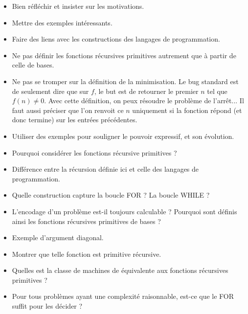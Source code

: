 \documentclass{agregfiche}
\begin{document}
\begin{itemize}
    \item Bien réfléchir et insister sur les motivations.
	\item Mettre des exemples intéressants.
    \item Faire des liens avec les constructions des langages de programmation.
	\item Ne pas définir les fonctions récursives primitives autrement que à partir de celle de bases.
    \item Ne pas se tromper sur la définition de la minimisation. Le bug standard est de seulement dire que sur $f$, le but est de retourner le premier $n$ tel que $f(n) \neq 0$. Avec cette définition, on peux résoudre le problème de l'arrêt... Il faut aussi préciser que l'on renvoit ce $n$ uniquement si la fonction répond (et donc termine) sur les entrées précédentes.
    \item Utiliser des exemples pour souligner le pouvoir expressif, et son évolution.
\end{itemize}

\secquestionsclassiques

\begin{itemize}
	\item Pourquoi considérer les fonctions récursive primitives ? %
	\item Différence entre la récursion définie ici et celle des langages de programmation.
    \item Quelle construction capture la boucle FOR ? La boucle WHILE 
    ?
	\item L'encodage d'un problème est-il toujours calculable ? 
	Pourquoi sont définis ainsi les fonctions récursives primitives 
	de bases ?
	\item Exemple d'argument diagonal.
	\item Montrer que telle fonction est primitive récursive.
    \item Quelles est la classe de machines de  équivalente aux fonctions récursives primitives ? %
    \item Pour tous problèmes ayant une complexité raisonnable, 
    est-ce que le FOR suffit pour les décider ?	
\end{itemize}
\end{document}
